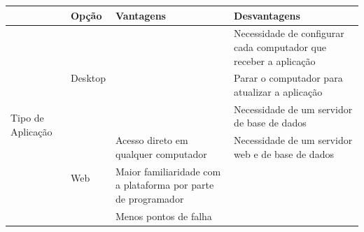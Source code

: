 \begin{longtable}{|p{}|p{}|p{}|p{}|}
	\hline
	& Opção                                                 & Vantagens                                                           & Desvantagens                                                                                        \\ \hline
	\multirow{6}{*}{Tipo de Aplicação}                                      & \multirow{3}{*}{Desktop}                              &                                                                     & Necessidade de configurar cada computador que receber a aplicação                                   \\
	&                                                       &                                                                     & Parar o computador para atualizar a aplicação                                                       \\
	&                                                       &                                                                     & Necessidade de um servidor de base de dados                                                         \\ \cline{2-4}
	& \multirow{3}{*}{Web}                                  & Acesso direto em qualquer computador                                & Necessidade de um servidor web e de base de dados                                                   \\
	&                                                       & Maior familiaridade com a plataforma por parte de programador       &                                                                                                     \\
	&                                                       & Menos pontos de falha                                               &                                                                                                     \\ \hline
	

\end{longtable}

